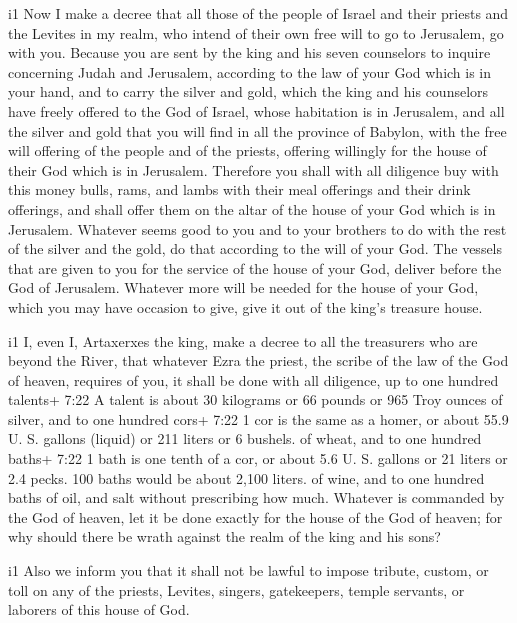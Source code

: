 i1 Now  I make a decree that all those of the people of
Israel and their priests and the Levites in my realm, who intend of
their own free will to go to Jerusalem, go with you. 
Because you are sent by the king and his seven counselors to inquire
concerning Judah and Jerusalem, according to the law of your God which
is in your hand,  and to carry the silver and gold, which
the king and his counselors have freely offered to the God of Israel,
whose habitation is in Jerusalem,  and all the silver and
gold that you will find in all the province of Babylon, with the free
will offering of the people and of the priests, offering willingly for
the house of their God which is in Jerusalem.  Therefore
you shall with all diligence buy with this money bulls, rams, and lambs
with their meal offerings and their drink offerings, and shall offer
them on the altar of the house of your God which is in Jerusalem.
 Whatever seems good to you and to your brothers to do with
the rest of the silver and the gold, do that according to the will of
your God.  The vessels that are given to you for the
service of the house of your God, deliver before the God of Jerusalem.
 Whatever more will be needed for the house of your God,
which you may have occasion to give, give it out of the king's treasure
house.

i1 I, even I, Artaxerxes the king, make a decree to all the
treasurers who are beyond the River, that whatever Ezra the priest, the
scribe of the law of the God of heaven, requires of you, it shall be
done with all diligence,  up to one hundred talents+ 7:22 A
talent is about 30 kilograms or 66 pounds or 965 Troy ounces of silver,
and to one hundred cors+ 7:22 1 cor is the same as a homer, or about
55.9 U. S. gallons (liquid) or 211 liters or 6 bushels. of wheat, and to
one hundred baths+ 7:22 1 bath is one tenth of a cor, or about 5.6 U. S.
gallons or 21 liters or 2.4 pecks. 100 baths would be about 2,100
liters. of wine, and to one hundred baths of oil, and salt without
prescribing how much.  Whatever is commanded by the God of
heaven, let it be done exactly for the house of the God of heaven; for
why should there be wrath against the realm of the king and his sons?

i1 Also we inform you that it shall not be lawful to impose
tribute, custom, or toll on any of the priests, Levites, singers,
gatekeepers, temple servants, or laborers of this house of God.

